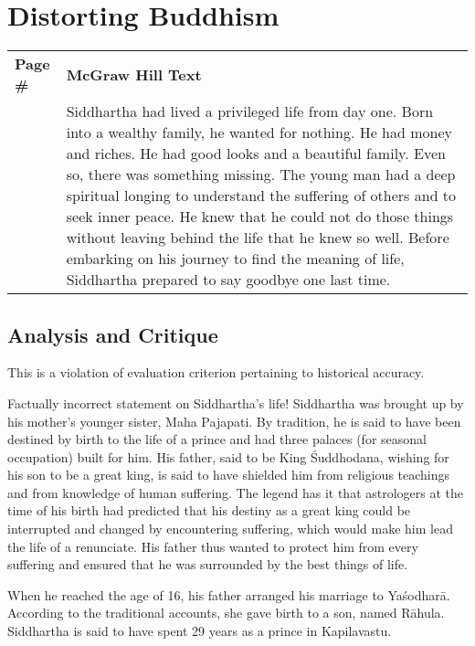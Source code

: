 \chapter{Distorting Buddhism}

{\renewcommand{\arraystretch}{1.2}
\begin{longtable}{|>{\raggedleft}p{1.5cm}|p{8.5cm}|}
\multicolumn{2}{c}{\textbf{Table: 1}}\\
\hline
\textbf{Page \#} & \textbf{McGraw Hill Text} \tabularnewline
\hline 
260 & Siddhartha had lived a privileged life from day one. Born into a wealthy family, he wanted for nothing. He had money and riches. He had good looks and a beautiful family. Even so, there was something missing. The young man had a deep spiritual longing to understand the suffering of others and to seek inner peace. He knew that he could not do those things without leaving behind the life that he knew so well. Before embarking on his journey to find the meaning of life, Siddhartha prepared to say goodbye one last time.\tabularnewline
\hline
\end{longtable}}
\medskip

\section*{Analysis and Critique} 

This is a violation of evaluation criterion pertaining to historical accuracy.
\vskip 3pt

Factually incorrect statement on Siddhartha's life! Siddhartha was brought up by his mother's younger sister, Maha Pajapati. By tradition, he is said to have been destined by birth to the life of a prince and had three palaces (for seasonal occupation) built for him. His father, said to be King Śuddhodana, wishing for his son to be a great king, is said to have shielded him from religious teachings and from knowledge of human suffering. The legend has it that astrologers at the time of his birth had predicted that his destiny as a great king could be interrupted and changed by encountering suffering, which would make him lead the life of a renunciate. His father thus wanted to protect him from every suffering and ensured that he was surrounded by the best things of life.
\newpage

When he reached the age of 16, his father arranged his marriage to Yaśodharā. According to the traditional accounts, she gave birth to a son, named Rāhula. Siddhartha is said to have spent 29 years as a prince in Kapilavastu. 

